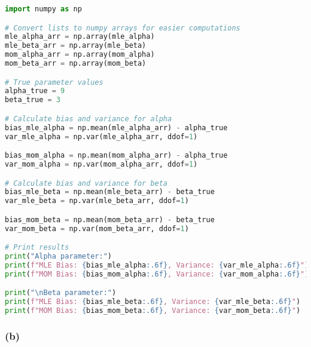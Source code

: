 \begin{lstlisting}[language=Python]
import numpy as np

# Convert lists to numpy arrays for easier computations
mle_alpha_arr = np.array(mle_alpha)
mle_beta_arr = np.array(mle_beta)
mom_alpha_arr = np.array(mom_alpha)
mom_beta_arr = np.array(mom_beta)

# True parameter values
alpha_true = 9
beta_true = 3

# Calculate bias and variance for alpha
bias_mle_alpha = np.mean(mle_alpha_arr) - alpha_true
var_mle_alpha = np.var(mle_alpha_arr, ddof=1)

bias_mom_alpha = np.mean(mom_alpha_arr) - alpha_true
var_mom_alpha = np.var(mom_alpha_arr, ddof=1)

# Calculate bias and variance for beta
bias_mle_beta = np.mean(mle_beta_arr) - beta_true
var_mle_beta = np.var(mle_beta_arr, ddof=1)

bias_mom_beta = np.mean(mom_beta_arr) - beta_true
var_mom_beta = np.var(mom_beta_arr, ddof=1)

# Print results
print("Alpha parameter:")
print(f"MLE Bias: {bias_mle_alpha:.6f}, Variance: {var_mle_alpha:.6f}")
print(f"MOM Bias: {bias_mom_alpha:.6f}, Variance: {var_mom_alpha:.6f}")

print("\nBeta parameter:")
print(f"MLE Bias: {bias_mle_beta:.6f}, Variance: {var_mle_beta:.6f}")
print(f"MOM Bias: {bias_mom_beta:.6f}, Variance: {var_mom_beta:.6f}")
\end{lstlisting}



\subsubsection*{(b)}


